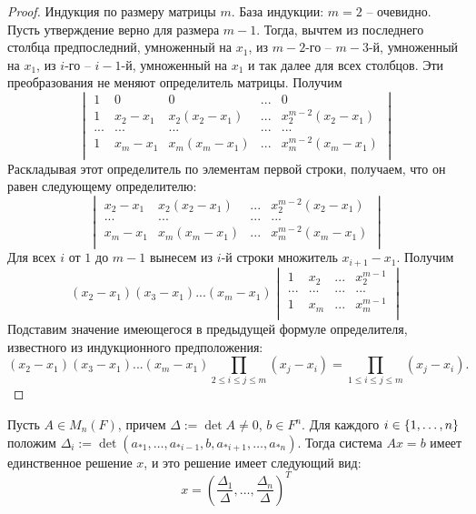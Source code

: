 \begin{proof}
    Индукция по размеру матрицы $m$.
    База индукции: $m = 2$ -- очевидно. Пусть утверждение верно для размера $m - 1$. Тогда, вычтем из последнего столбца предпоследний, умноженный на $x_{1}$, из $m-2$-го -- $m-3$-й, умноженный на $x_{1}$, из $i$-го -- $i-1$-й, умноженный на $x_{1}$ и так далее для всех столбцов. Эти преобразования не меняют определитель матрицы. Получим
    \[\begin{vmatrix}
    1 & 0 & 0 & ... & 0 \\
    1 & x_2 - x_1 & x_{2}(x_{2} - x_1) & ... & x_{2}^{m-2}(x_2 - x_1) \\
    ... & ... & ... & ... & ... \\
    1 & x_m - x_1 & x_{m}(x_{m} - x_1) & ... & x_{m}^{m-2}(x_m - x_1) \\
    \end{vmatrix}\]
    Раскладывая этот определитель по элементам первой строки, получаем, что он равен следующему определителю:
    \[\begin{vmatrix}
    x_2 - x_1 & x_2 (x_2 - x_1) & ... & x_{2}^{m-2}(x_2 - x_1) \\
    ... & ... & ... & ... \\
    x_m - x_1 & x_m (x_m - x_1) & ... & x_{m}^{m-2}(x_m - x_1) \\
    \end{vmatrix}\]
    Для всех $i$ от $1$ до $m-1$ вынесем из $i$-й строки множитель $x_{i+1} - x_1$. Получим
    \[(x_2 - x_1)(x_3 - x_1)...(x_m - x_1) \begin{vmatrix}
    1 & x_2 & ... & x_{2}^{m-1} \\
    ... & ... & ... & ... \\
    1 & x_m & ... & x_{m}^{m-1} \\
    \end{vmatrix}\]
    Подставим значение имеющегося в предыдущей формуле определителя, известного из индукционного предположения:
    \[(x_2 - x_1)(x_3 - x_1)...(x_m - x_1) \prod_{2 \leq i \leq j \leq m} (x_j - x_i) = \prod_{1 \leq i \leq j \leq m} (x_j - x_i).\]
\end{proof}

\begin{theorem}[Крамера]
	Пусть $A \in M_n(F)$, причем $\Delta := \det{A} \ne 0$, $b \in F^n$. Для каждого $i \in \{1, \dotsc, n\}$ положим $\Delta_i := \det (a_{*1},\dots,a_{*i-1},b,a_{*i+1},\dots,a_{*n})$. Тогда система $Ax = b$ имеет единственное решение $x$, и это решение имеет следующий вид:
	\[x = \left(\frac{\Delta_1}{\Delta}, \dotsc, \frac{\Delta_n}{\Delta}\right)^T\]
\end{theorem}

